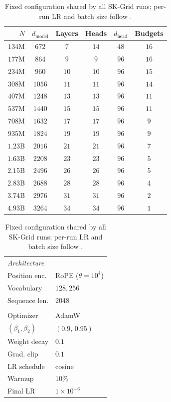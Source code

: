 \documentclass[]{fairmeta}
\begin{document}
\begin{table}[ht]
\centering
\scriptsize
\begin{minipage}[t]{0.5\linewidth}
\centering
\setlength{\tabcolsep}{3pt}
\caption{SK-Grid model configurations.}
\label{tab:model_configs}
\begin{tabular}{rccccc}
\toprule
$N$ & $d_{\text{model}}$ & Layers & Heads & $d_{\text{head}}$ & Budgets \\
\midrule
$134$M  & $672$  & $7$  & $14$ & $48$ & $16$ \\
$177$M  & $864$  & $9$  & $9$  & $96$ & $16$ \\
$234$M  & $960$  & $10$ & $10$ & $96$ & $15$ \\
$308$M  & $1056$ & $11$ & $11$ & $96$ & $14$ \\
$407$M  & $1248$ & $13$ & $13$ & $96$ & $11$ \\
$537$M  & $1440$ & $15$ & $15$ & $96$ & $11$ \\
$708$M  & $1632$ & $17$ & $17$ & $96$ & $9$  \\
$935$M  & $1824$ & $19$ & $19$ & $96$ & $9$  \\
$1.23$B & $2016$ & $21$ & $21$ & $96$ & $7$  \\
$1.63$B & $2208$ & $23$ & $23$ & $96$ & $5$  \\
$2.15$B & $2496$ & $26$ & $26$ & $96$ & $5$  \\
$2.83$B & $2688$ & $28$ & $28$ & $96$ & $4$  \\
$3.74$B & $2976$ & $31$ & $31$ & $96$ & $2$  \\
$4.93$B & $3264$ & $34$ & $34$ & $96$ & $1$  \\
\bottomrule
\end{tabular}
\end{minipage}\hfill
\begin{minipage}[t]{0.48\linewidth}
\centering
\setlength{\tabcolsep}{5pt}
\caption{Fixed configuration shared by all SK-Grid runs; per-run LR and batch size follow .}
\label{tab:hparams}
\begin{tabular}{ll}
\toprule
\multicolumn{2}{l}{\emph{Architecture}} \\
Position enc. & RoPE ($\theta{=}10^{4}$) \\
Vocabulary    & $128{,}256$ \\
Sequence len. & $2048$ \\
\addlinespace
\multicolumn{2}{l}{\emph{Optimization}} \\
Optimizer     & AdamW \\
$(\beta_1,\beta_2)$ & $(0.9,\,0.95)$ \\
Weight decay  & $0.1$ \\
Grad. clip    & $0.1$ \\
LR schedule   & cosine \\
Warmup        & $10\%$ \\
Final LR      & $1 \times 10^{-6}$ \\
\bottomrule
\end{tabular}
\end{minipage}
\end{table}
\end{document}
